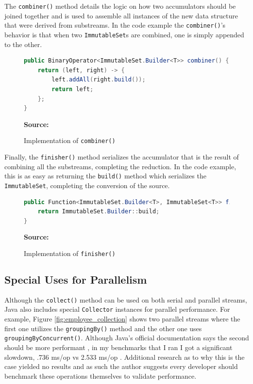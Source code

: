 \documentclass[oneside, 12pt]{article}
\newcommand{\source}[1]{\textbf{Source:} {#1} }
\begin{document}
The \verb|combiner()| method details the logic on how two accumulators should be joined together and is used to assemble all instances of the new data structure that were derived from substreams. In the code example the \verb|combiner()|'s behavior is that when two \verb|ImmutableSet|s are combined, one is simply appended to the other.

\begin{figure}[H]
\centering
\begin{lstlisting}[language=Java]
public BinaryOperator<ImmutableSet.Builder<T>> combiner() {
    return (left, right) -> {
        left.addAll(right.build());
        return left;
    };
}
\end{lstlisting}
\caption{Implementation of {\tt combiner()}}
\source{\autocite{custom_collector}}
\label{fig:combiner}
\end{figure}

Finally, the \verb|finisher()| method serializes the accumulator that is the result of combining all the substreams, completing the reduction. In the code example, this is as easy as returning the \verb|build()| method which serializes the \verb|ImmutableSet|, completing the conversion of the source.

\begin{figure}[H]
\centering
\begin{lstlisting}[language=Java]
public Function<ImmutableSet.Builder<T>, ImmutableSet<T>> finisher() {
    return ImmutableSet.Builder::build;
}
\end{lstlisting}
\caption{Implementation of {\tt finisher()}}
\source{\autocite{custom_collector}}
\label{fig:finisher}
\end{figure}

\subsection{Special Uses for Parallelism}
Although the \verb|collect()| method can be used on both serial and parallel streams, Java also includes special \verb|Collector| instances for parallel performance. For example, Figure \ref{fig:employee_collection} shows two parallel streams where the first one utilizes the \verb|groupingBy()| method and the other one uses \verb|groupingByConcurrent()|. Although Java's official documentation says the second should be more performant \autocite{parallelism_doc}, in my benchmarks that I ran I got a significant slowdown, .736 ms/op vs 2.533 ms/op \autocite{benchmark_software}. Additional research as to why this is the case yielded no results and as such the author suggests every developer should benchmark these operations themselves to validate performance.
\end{document}
